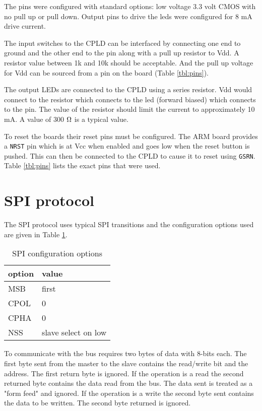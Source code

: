 \documentclass{article}
\begin{document}
The pins were configured with standard options:
low voltage 3.3 volt CMOS with no pull up or pull down.
Output pins to drive the leds were configured for 8 mA drive current.

The input switches to the CPLD can be interfaced by connecting
one end to ground and the other end to the pin along with a
pull up resistor to Vdd.
A resistor value between 1k and 10k should be acceptable.
And the pull up voltage for Vdd can be sourced from a pin on
the board (Table \ref{tbl:pins}).

The output LEDs are connected to the CPLD using a series
resistor.
Vdd would connect to the resistor which connects to the led
(forward biased) which connects to the pin.
The value of the resistor should limit the current to approximately
10 mA.
A value of 300 $\ohm$ is a typical value.

To reset the boards their reset pins must be configured.
The ARM board provides a \verb+NRST+ pin which is at Vcc
when enabled and goes low when the reset button is pushed\cite[Pg. 17, 20]{UM1079}.
This can then be connected to the CPLD to cause
it to reset using \verb+GSRN+\citetext{\citealp[Pg. 13, 46, 50, 53]{DS1002}; \citealp[Pg. 8]{EB66}}.
Table \ref{tbl:pins} lists the exact pins that were used.


\section{SPI protocol}

The SPI protocol uses typical SPI transitions
\citetext{ \citealp[Pg. 278]{cady2009microcontrollers}; \citealp[Pg. 665]{STRM0038}}
and the configuration options used are given in Table \ref{tbl:spi}.

\begin{table}
\center
\begin{tabular}{|l|l|}
	\hline
	option & value \\
	\hline
	MSB & first \\
	CPOL & 0 \\
	CPHA & 0 \\
	NSS & slave select on low \\
	\hline
\end{tabular}
\caption{SPI configuration options}
\label{tbl:spi}
\end{table}

To communicate with the bus requires two bytes of data with
8-bits each.
The first byte sent from the master to the slave
contains the read/write bit and the address.
The first return byte is ignored.
If the operation is a read the second returned byte
contains the data read from the bus.
The data sent is treated as a "form feed" and ignored.
If the operation is a write the second byte sent
contains the data to be written.
The second byte returned is ignored.
\end{document}
